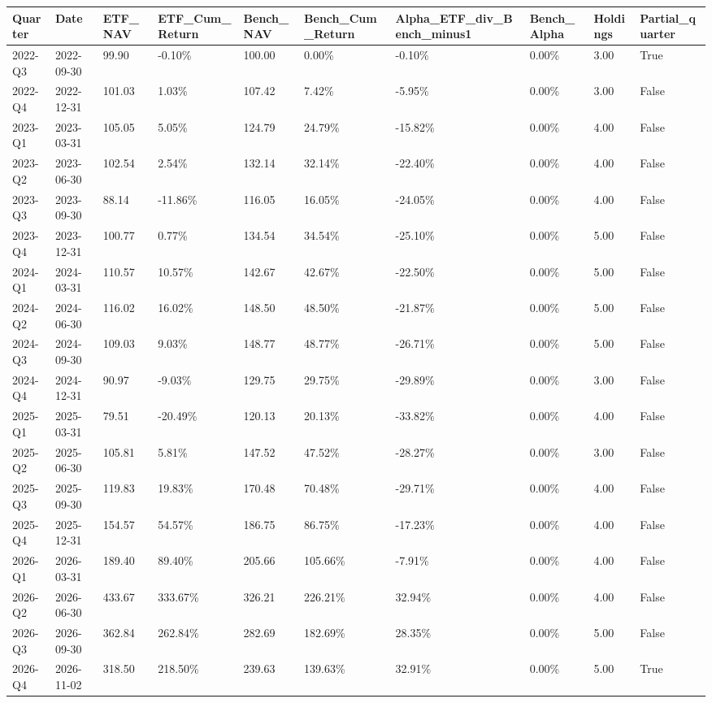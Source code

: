 \begin{longtable}{llllllllll}
Quarter & Date & ETF\_NAV & ETF\_Cum\_Return & Bench\_NAV & Bench\_Cum\_Return & Alpha\_ETF\_div\_Bench\_minus1 & Bench\_Alpha & Holdings & Partial\_quarter \\
\hline
2022-Q3 & 2022-09-30 & 99.90 & -0.10\% & 100.00 & 0.00\% & -0.10\% & 0.00\% & 3.00 & True \\
2022-Q4 & 2022-12-31 & 101.03 & 1.03\% & 107.42 & 7.42\% & -5.95\% & 0.00\% & 3.00 & False \\
2023-Q1 & 2023-03-31 & 105.05 & 5.05\% & 124.79 & 24.79\% & -15.82\% & 0.00\% & 4.00 & False \\
2023-Q2 & 2023-06-30 & 102.54 & 2.54\% & 132.14 & 32.14\% & -22.40\% & 0.00\% & 4.00 & False \\
2023-Q3 & 2023-09-30 & 88.14 & -11.86\% & 116.05 & 16.05\% & -24.05\% & 0.00\% & 4.00 & False \\
2023-Q4 & 2023-12-31 & 100.77 & 0.77\% & 134.54 & 34.54\% & -25.10\% & 0.00\% & 5.00 & False \\
2024-Q1 & 2024-03-31 & 110.57 & 10.57\% & 142.67 & 42.67\% & -22.50\% & 0.00\% & 5.00 & False \\
2024-Q2 & 2024-06-30 & 116.02 & 16.02\% & 148.50 & 48.50\% & -21.87\% & 0.00\% & 5.00 & False \\
2024-Q3 & 2024-09-30 & 109.03 & 9.03\% & 148.77 & 48.77\% & -26.71\% & 0.00\% & 5.00 & False \\
2024-Q4 & 2024-12-31 & 90.97 & -9.03\% & 129.75 & 29.75\% & -29.89\% & 0.00\% & 3.00 & False \\
2025-Q1 & 2025-03-31 & 79.51 & -20.49\% & 120.13 & 20.13\% & -33.82\% & 0.00\% & 4.00 & False \\
2025-Q2 & 2025-06-30 & 105.81 & 5.81\% & 147.52 & 47.52\% & -28.27\% & 0.00\% & 3.00 & False \\
2025-Q3 & 2025-09-30 & 119.83 & 19.83\% & 170.48 & 70.48\% & -29.71\% & 0.00\% & 4.00 & False \\
2025-Q4 & 2025-12-31 & 154.57 & 54.57\% & 186.75 & 86.75\% & -17.23\% & 0.00\% & 4.00 & False \\
2026-Q1 & 2026-03-31 & 189.40 & 89.40\% & 205.66 & 105.66\% & -7.91\% & 0.00\% & 4.00 & False \\
2026-Q2 & 2026-06-30 & 433.67 & 333.67\% & 326.21 & 226.21\% & 32.94\% & 0.00\% & 4.00 & False \\
2026-Q3 & 2026-09-30 & 362.84 & 262.84\% & 282.69 & 182.69\% & 28.35\% & 0.00\% & 5.00 & False \\
2026-Q4 & 2026-11-02 & 318.50 & 218.50\% & 239.63 & 139.63\% & 32.91\% & 0.00\% & 5.00 & True \\
\end{longtable}
